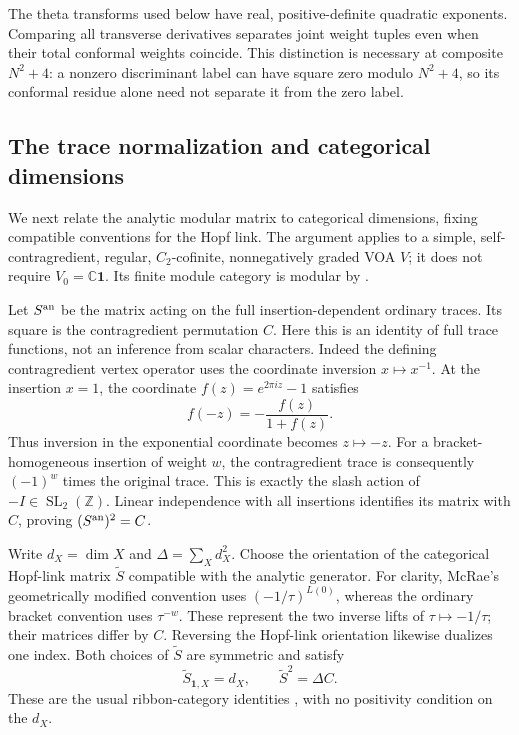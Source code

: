 \documentclass[11pt,a4paper]{article}
\numberwithin{equation}{section}
\theoremstyle{definition}\newtheorem{definition}[theorem]{Definition}
\theoremstyle{remark}\newtheorem{remark}[theorem]{Remark}
\begin{document}
The theta transforms used below have real, positive-definite
quadratic exponents.  Comparing all transverse derivatives
separates joint weight tuples even when their total conformal
weights coincide.  This distinction is necessary at composite
$N^2+4$: a nonzero discriminant label can have square zero
modulo $N^2+4$, so its conformal residue alone need not separate
it from the zero label.


\subsection{The trace normalization and categorical dimensions}
\label{audit:analytic-normalization}

We next relate the analytic modular matrix to categorical dimensions,
fixing compatible conventions for the Hopf link.  The argument applies
to a simple, self-contragredient,
regular, $C_2$-cofinite, nonnegatively graded VOA $V$; it does not require
$V_0=\mathbb C\mathbf1$. Its finite module category is modular by
\cite[Corollary 5.19]{mcrae}.

Let $S^{\rm an}$ be the matrix acting on the full insertion-dependent
ordinary traces. Its square is the contragredient permutation $C$.
Here this is an identity of full trace functions, not an inference from
scalar characters. Indeed the defining contragredient vertex operator
uses the coordinate inversion $x\mapsto x^{-1}$. At the insertion
$x=1$, the coordinate $f(z)=e^{2\pi iz}-1$ satisfies
\[
 f(-z)=-\frac{f(z)}{1+f(z)}.
\]
Thus inversion in the exponential coordinate becomes $z\mapsto-z$.
For a bracket-homogeneous insertion of weight $w$, the contragredient
trace is consequently $(-1)^w$ times the original trace. This is
exactly the slash action of $-I\in\operatorname{SL}_2(\mathbb Z)$.
Linear independence with all insertions identifies its matrix with
$C$, proving $(S^{\rm an})^2=C$.

Write $d_X=\dim X$ and $\Delta=\sum_Xd_X^2$.
Choose the orientation of the categorical Hopf-link matrix
$\widetilde S$ compatible with the analytic generator. For clarity,
McRae's geometrically modified convention uses
$(-1/\tau)^{L(0)}$, whereas the ordinary bracket convention uses
$\tau^{-w}$. These represent the two inverse lifts of
$\tau\mapsto-1/\tau$; their matrices differ by $C$.
Reversing the Hopf-link orientation likewise dualizes one index.
Both choices of $\widetilde S$ are symmetric and satisfy
\[
 \widetilde S_{\mathbf1,X}=d_X,\qquad
 \widetilde S^2=\Delta C.
\]
These are the usual ribbon-category identities
\cite[Section 4]{ko}, with no positivity condition on the $d_X$.
\end{document}
